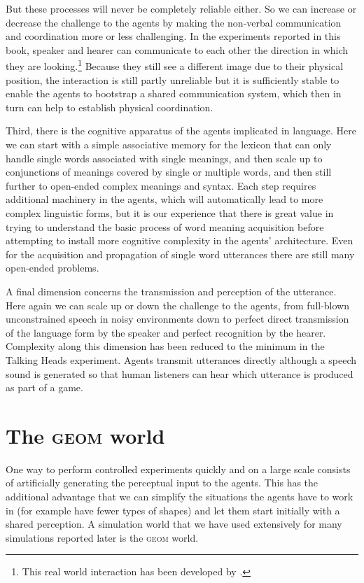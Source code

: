But these processes will never be completely 
reliable either. So we can increase or decrease the challenge
to the agents by making the non-verbal communication and 
coordination more or less challenging. In the experiments 
reported in this book, speaker and hearer can communicate to each 
other the direction in which they 
are looking.\footnote{
This real world interaction has been developed 
by \cite{Kaplan:1999}.}
Because they still see a 
different image due to their physical position, the 
interaction is still partly unreliable but it is sufficiently stable 
to enable the agents to bootstrap a shared communication
system, which then in turn can help to establish 
physical coordination. 

Third, there is the cognitive apparatus of the agents
implicated in language. Here we can start with a simple 
associative memory for the lexicon 
that can only handle single words
associated with single meanings, and then scale up to 
conjunctions of meanings covered by single or
multiple words, and then still further to open-ended
complex meanings and syntax. 
Each step requires additional machinery in the agents, 
which will automatically lead to more complex linguistic
forms, but it is our experience that there is great value in
trying to understand the basic process of word 
meaning acquisition before attempting to install more 
cognitive complexity in the agents' architecture. Even for the
acquisition and propagation of single word utterances there are 
still many open-ended problems. 

A final dimension concerns the transmission and 
perception of the utterance. Here again we can scale
up or down the challenge to the agents, from full-blown 
unconstrained speech in noisy environments down to perfect direct
transmission of the language form by the 
speaker and perfect recognition by the hearer. 
Complexity along this dimension has been reduced to 
the minimum in the Talking Heads experiment. Agents 
transmit utterances directly although a speech sound
is generated so that human listeners can hear which
utterance is produced as part of a game. 

\section{The \textsc{geom} world}

One way to perform controlled experiments 
quickly and on a large scale consists of artificially 
generating the perceptual input to the agents. 
This has the additional advantage that we can 
simplify the situations the agents have to work in
(for example have fewer types of shapes) 
and let them start initially with a shared perception. A 
simulation world that we have used extensively 
for many simulations reported later 
is the \textsc{geom} world. 

